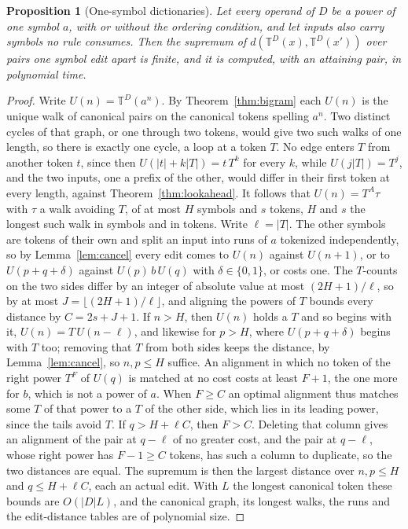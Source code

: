 \documentclass[11pt,a4paper]{article}
\theoremstyle{definition}
\theoremstyle{plain}
\newtheorem{proposition}{Proposition}
\newcommand{\T}{\mathbb{T}}
\begin{document}
\begin{proposition}[One-symbol dictionaries]\label{prop:unary}
Let every operand of \(D\) be a power of one symbol \(a\), with or without the ordering condition, and let inputs also
carry symbols no rule consumes. Then the supremum of \(d(\T^D(x), \T^D(x'))\) over pairs one symbol edit apart is
finite, and it is computed, with an attaining pair, in polynomial time.
\end{proposition}

\begin{proof}
Write \(U(n) = \T^D(a^n)\). By Theorem~\ref{thm:bigram} each \(U(n)\) is the unique walk of canonical pairs on the
canonical tokens spelling \(a^n\). Two distinct cycles of that graph, or one through two tokens, would give two such
walks of one length, so there is exactly one cycle, a loop at a token \(T\). No edge enters \(T\) from another token
\(t\), since then \(U(|t| + k|T|) = t\,T^k\) for every \(k\), while \(U(j|T|) = T^j\), and the two inputs, one a prefix
of the other, would differ in their first token at every length, against Theorem~\ref{thm:lookahead}. It follows that
\(U(n) = T^A\tau\) with \(\tau\) a walk avoiding \(T\), of at most \(H\) symbols and \(s\) tokens, \(H\) and \(s\) the
longest such walk in symbols and in tokens. Write \(\ell = |T|\). The other symbols are tokens of their own and split an
input into runs of \(a\) tokenized independently, so by Lemma~\ref{lem:cancel} every edit comes to \(U(n)\) against
\(U(n + 1)\), or to \(U(p + q + \delta)\) against \(U(p)\,b\,U(q)\) with \(\delta \in \{0, 1\}\), or costs one. The
\(T\)-counts on the two sides differ by an integer of absolute value at most \((2H + 1)/\ell\), so by at most
\(J = \lfloor (2H + 1)/\ell \rfloor\), and aligning the powers of \(T\) bounds every distance by \(C = 2s + J + 1\). If
\(n > H\), then \(U(n)\) holds a \(T\) and so begins with it, \(U(n) = T\,U(n - \ell)\), and likewise for \(p > H\),
where \(U(p + q + \delta)\) begins with \(T\) too; removing that \(T\) from both sides keeps the distance, by
Lemma~\ref{lem:cancel}, so \(n, p \le H\) suffice. An alignment in which no token of the right power \(T^F\) of \(U(q)\)
is matched at no cost costs at least \(F + 1\), the one more for \(b\), which is not a power of \(a\). When \(F \ge C\)
an optimal alignment thus matches some \(T\) of that power to a \(T\) of the other side, which lies in its leading
power, since the tails avoid \(T\). If \(q > H + \ell C\), then \(F > C\). Deleting that column gives an alignment of
the pair at \(q - \ell\) of no greater cost, and the pair at \(q - \ell\), whose right power has \(F - 1 \ge C\) tokens,
has such a column to duplicate, so the two distances are equal. The supremum is then the largest distance over
\(n, p \le H\) and \(q \le H + \ell C\), each an actual edit. With \(L\) the longest canonical token these bounds are
\(O(|D|L)\), and the canonical graph, its longest walks, the runs and the edit-distance tables are of polynomial size.
\end{proof}
\end{document}
